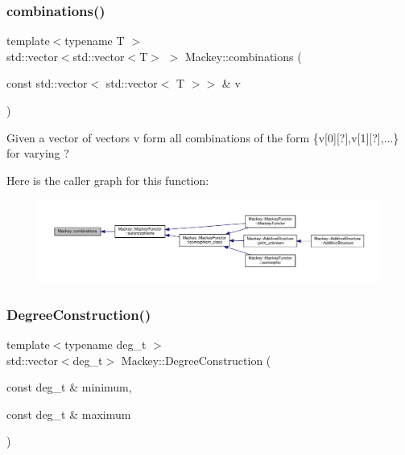 \subsubsection{\texorpdfstring{combinations()}{combinations()}}
{\footnotesize\ttfamily template$<$typename T $>$ \\
std\+::vector$<$std\+::vector$<$T$>$ $>$ Mackey\+::combinations (\begin{DoxyParamCaption}\item[{const std\+::vector$<$ std\+::vector$<$ T $>$$>$ \&}]{v }\end{DoxyParamCaption})}



Given a vector of vectors v form all combinations of the form \{v\mbox{[}0\mbox{]}\mbox{[}?\mbox{]},v\mbox{[}1\mbox{]}\mbox{[}?\mbox{]},...\} for varying ? 

Here is the caller graph for this function\+:\nopagebreak
\begin{figure}[H]
\begin{center}
\leavevmode
\includegraphics[width=350pt]{namespaceMackey_a3a4b7761ed7274b145eed9a451b53e61_icgraph}
\end{center}
\end{figure}
\mbox{\label{namespaceMackey_a49fef6f64b67ff118d35ac45b9c92972}} 
\subsubsection{\texorpdfstring{Degree\+Construction()}{DegreeConstruction()}}
{\footnotesize\ttfamily template$<$typename deg\+\_\+t $>$ \\
std\+::vector$<$deg\+\_\+t$>$ Mackey\+::\+Degree\+Construction (\begin{DoxyParamCaption}\item[{const deg\+\_\+t \&}]{minimum,  }\item[{const deg\+\_\+t \&}]{maximum }\end{DoxyParamCaption})}



